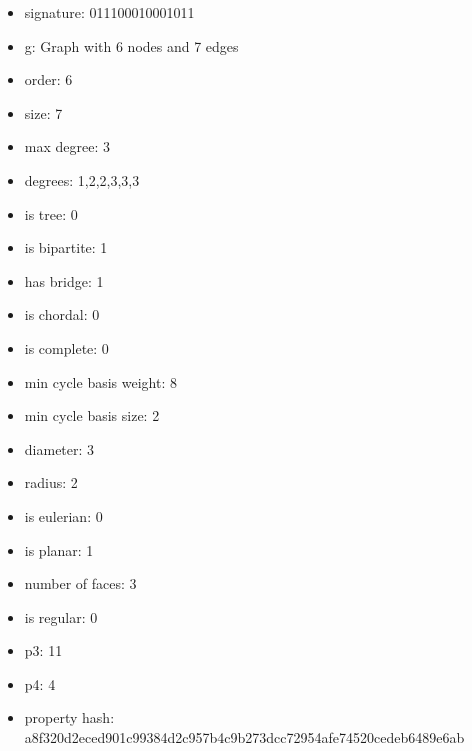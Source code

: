 \begin{itemize}
\item signature: 011100010001011
\item g: Graph with 6 nodes and 7 edges
\item order: 6
\item size: 7
\item max degree: 3
\item degrees: 1,2,2,3,3,3
\item is tree: 0
\item is bipartite: 1
\item has bridge: 1
\item is chordal: 0
\item is complete: 0
\item min cycle basis weight: 8
\item min cycle basis size: 2
\item diameter: 3
\item radius: 2
\item is eulerian: 0
\item is planar: 1
\item number of faces: 3
\item is regular: 0
\item p3: 11
\item p4: 4
\item property hash: a8f320d2eced901c99384d2c957b4c9b273dcc72954afe74520cedeb6489e6ab
\end{itemize}
\newpage
\begin{figure}
\end{figure}
